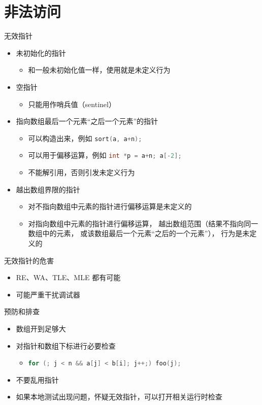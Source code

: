 \documentclass[10pt,mathserif]{beamer}%
\begin{document}
\section{非法访问}
\begin{frame}{无效指针}
	\begin{itemize}
		\item 未初始化的指针
			\begin{itemize}
				\item 和一般未初始化值一样，使用就是未定义行为
			\end{itemize}
		\item 空指针
			\begin{itemize}
				\item 只能用作哨兵值（sentinel）
			\end{itemize}
		\item 指向数组最后一个元素“之后一个元素”的指针
			\begin{itemize}
				\item 可以构造出来，例如
					\lstinline[language=C++]!sort(a, a+n);!
				\item 可以用于偏移运算，例如
					\lstinline[language=C++]!int *p = a+n; a[-2];!
				\item 不能解引用，否则引发未定义行为
			\end{itemize}
		\item 越出数组界限的指针
			\begin{itemize}
				\item 对不指向数组中元素的指针进行偏移运算是未定义的
				\item 对指向数组中元素的指针进行偏移运算，
					越出数组范围（结果不指向同一数组中的元素，
					或该数组最后一个元素“之后的一个元素”），
					行为是未定义的
			\end{itemize}
	\end{itemize}
\end{frame}

\begin{frame}{无效指针的危害}
	\begin{itemize}
		\item RE、WA、TLE、MLE 都有可能
		\item 可能严重干扰调试器
	\end{itemize}
\end{frame}

\begin{frame}{预防和排查}
	\begin{itemize}
		\item 数组开到足够大
		\item 对指针和数组下标进行必要检查
			\begin{itemize}
				\item
\lstinline[language=C++]!for (; j < n && a[j] < b[i]; j++;) foo(j);!
			\end{itemize}
		\item 不要乱用指针
		\item 如果本地测试出现问题，怀疑无效指针，可以打开相关运行时检查
	\end{itemize}
\end{frame}
\end{document}
